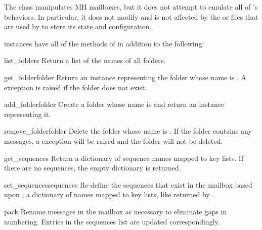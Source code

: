 The  class manipulates MH mailboxes, but it does not attempt to
emulate all of 's behaviors. In particular, it does not modify and
is not affected by the  or  files that are used
by  to store its state and configuration.

 instances have all of the methods of  in addition to
the following:

\begin{methoddesc}{list_folders}{}
Return a list of the names of all folders.
\end{methoddesc}

\begin{methoddesc}{get_folder}{folder}
Return an  instance representing the folder whose name is
. A  exception is raised if the
folder does not exist.
\end{methoddesc}

\begin{methoddesc}{add_folder}{folder}
Create a folder whose name is  and return an  instance
representing it.
\end{methoddesc}

\begin{methoddesc}{remove_folder}{folder}
Delete the folder whose name is . If the folder contains any
messages, a  exception will be raised and the folder
will not be deleted.
\end{methoddesc}

\begin{methoddesc}{get_sequences}{}
Return a dictionary of sequence names mapped to key lists. If there are no
sequences, the empty dictionary is returned.
\end{methoddesc}

\begin{methoddesc}{set_sequences}{sequences}
Re-define the sequences that exist in the mailbox based upon , a
dictionary of names mapped to key lists, like returned by
.
\end{methoddesc}

\begin{methoddesc}{pack}{}
Rename messages in the mailbox as necessary to eliminate gaps in numbering.
Entries in the sequences list are updated correspondingly. 
\end{methoddesc}

